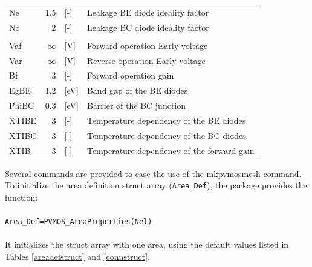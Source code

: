 \documentclass[noshowpacs,preprintnumbers,amsmath,amssymb, letter]{revtex4}
\begin{document}
\begin{table}[H]
\begin{longtable}{lrlp{}}
Ne		&  1.5			& [-]						& Leakage BE diode ideality factor\\
Nc		&  2			& [-]						& Leakage BC diode ideality factor\\\\
Vaf		&  $\infty$		& [V]						& Forward operation Early voltage\\
Var		&  $\infty$		& [V]						& Reverse operation Early voltage\\
Bf		&  3			& [-]						& Forward operation gain\\
EgBE	&  1.2			& [eV]						& Band gap of the BE diodes\\
PhiBC	&  0.3			& [eV]						& Barrier of the BC junction\\
XTIBE	&  3			& [-]						& Temperature dependency of the BE diodes\\
XTIBC	&  3			& [-]						& Temperature dependency of the BC diodes\\
XTIB	&  3			& [-]						& Temperature dependency of the forward gain\\
\end{longtable}
\end{table}

Several commands are provided to ease the use of the mkpvmosmesh command. To initialize the area definition struct array (\texttt{Area\_Def}), the package provides the function:\\ \\
\texttt{Area\_Def=PVMOS\_AreaProperties(Nel)}\\ \\
It initializes the struct array with one area, using the default values listed in Tables \ref{areadefstruct} and \ref{connstruct}.
\end{document}
